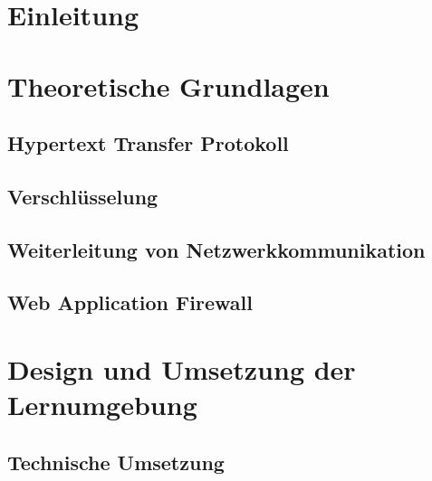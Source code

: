 \documentclass[a4paper, 12pt]{article}
\begin{document}
    
    
    

    \section{Einleitung}
    

    \section{Theoretische Grundlagen}
    \label{sec:theoretical-foundations}
    \subsection{Hypertext Transfer Protokoll}
    
    \subsection{Verschlüsselung}
    
    \subsection{Weiterleitung von Netzwerkkommunikation}
    
    \subsection{Web Application Firewall}
    
    \pagebreak

    \section{Design und Umsetzung der Lernumgebung}
    
    \subsection{Technische Umsetzung}
    
\end{document}
